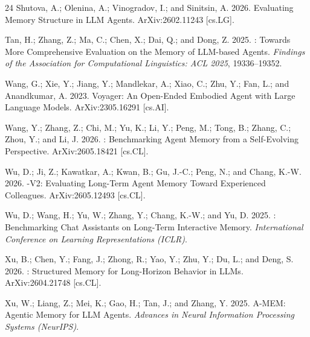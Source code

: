 \documentclass[letterpaper]{article}
\begin{document}
\begin{thebibliography}{24}
Shutova, A.; Olenina, A.; Vinogradov, I.; and Sinitsin, A. 2026.
\newblock Evaluating {Memory} {Structure} in {LLM} {Agents}.
\newblock ArXiv:2602.11243 [cs.LG].

Tan, H.; Zhang, Z.; Ma, C.; Chen, X.; Dai, Q.; and Dong, Z. 2025.
: {Towards} {More} {Comprehensive} {Evaluation} on the
  {Memory} of {LLM}-based {Agents}.
\newblock \emph{Findings of the Association for Computational Linguistics:
  ACL 2025}, 19336--19352.

Wang, G.; Xie, Y.; Jiang, Y.; Mandlekar, A.; Xiao, C.; Zhu, Y.; Fan, L.; and
  Anandkumar, A. 2023.
\newblock Voyager: {An} {Open}-{Ended} {Embodied} {Agent} with {Large}
  {Language} {Models}.
\newblock ArXiv:2305.16291 [cs.AI].

Wang, Y.; Zhang, Z.; Chi, M.; Yu, K.; Li, Y.; Peng, M.; Tong, B.; Zhang, C.;
  Zhou, Y.; and Li, J. 2026.
: {Benchmarking} {Agent} {Memory} from a
  {Self}-{Evolving} {Perspective}.
\newblock ArXiv:2605.18421 [cs.CL].

Wu, D.; Ji, Z.; Kawatkar, A.; Kwan, B.; Gu, J.-C.; Peng, N.; and Chang, K.-W.
  2026.
-{V2}: {Evaluating} {Long}-{Term} {Agent} {Memory}
  {Toward} {Experienced} {Colleagues}.
\newblock ArXiv:2605.12493 [cs.CL].

Wu, D.; Wang, H.; Yu, W.; Zhang, Y.; Chang, K.-W.; and Yu, D. 2025.
: {Benchmarking} {Chat} {Assistants} on {Long}-{Term}
  {Interactive} {Memory}.
\newblock \emph{International Conference on Learning Representations (ICLR)}.

Xu, B.; Chen, Y.; Fang, J.; Zhong, R.; Yao, Y.; Zhu, Y.; Du, L.; and Deng, S.
  2026.
: {Structured} {Memory} for {Long}-{Horizon} {Behavior} in
  {LLMs}.
\newblock ArXiv:2604.21748 [cs.CL].

Xu, W.; Liang, Z.; Mei, K.; Gao, H.; Tan, J.; and Zhang, Y. 2025.
\newblock A-{MEM}: {Agentic} {Memory} for {LLM} {Agents}.
\newblock \emph{Advances in Neural Information Processing Systems (NeurIPS)}.


\end{thebibliography}
\end{document}
